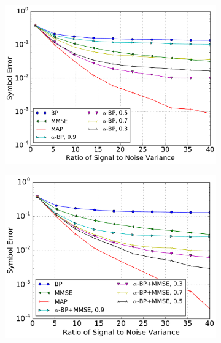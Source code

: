 \begin{figure}[!t]
  \begin{subfigure}{0.5\textwidth}
    \includegraphics[width=1\columnwidth]{figures/alpha_compare_crop.pdf}
    \caption{}
    \label{fig:mimo_a}
  \end{subfigure}
  \begin{subfigure}{0.5\textwidth}
    \includegraphics[width=1\columnwidth]{figures/prior_mmse_alpha_compare_crop.pdf}
    \caption{}
    \label{fig:mimo_b}
  \end{subfigure}
  \begin{subfigure}{0.5\textwidth}

\end{subfigure}
\end{figure}
